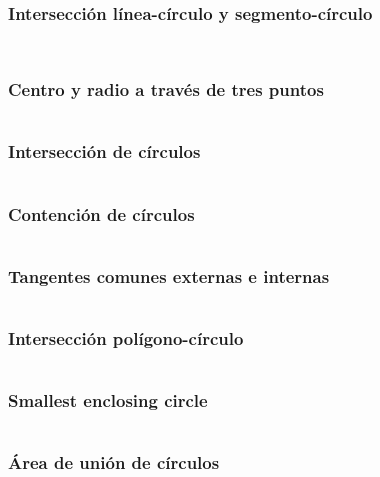 \documentclass[11pt]{article}
\begin{document}
			\subsubsection{Intersección línea-círculo y segmento-círculo}
			\inputminted[tabsize=2,breaklines,firstline=339,lastline=349,fontsize=\small]{c++}{geometry.cpp}
			\inputminted[tabsize=2,breaklines,firstline=351,lastline=358,fontsize=\small]{c++}{geometry.cpp}
			
			\subsubsection{Centro y radio a través de tres puntos}
			\inputminted[tabsize=2,breaklines,firstline=360,lastline=365,fontsize=\small]{c++}{geometry.cpp}
			
			\subsubsection{Intersección de círculos}
			\inputminted[tabsize=2,breaklines,firstline=367,lastline=382,fontsize=\small]{c++}{geometry.cpp}
			
			\subsubsection{Contención de círculos}
			\inputminted[tabsize=2,breaklines,firstline=384,lastline=403,fontsize=\small]{c++}{geometry.cpp}
			
			\subsubsection{Tangentes comunes externas e internas}
			\inputminted[tabsize=2,breaklines,firstline=405,lastline=417,fontsize=\small]{c++}{geometry.cpp}
			
			\subsubsection{Intersección polígono-círculo}
			\inputminted[tabsize=2,breaklines,firstline=419,lastline=454,fontsize=\small]{c++}{geometry.cpp}
			
			\subsubsection{Smallest enclosing circle}
			\inputminted[tabsize=2,breaklines,firstline=456,lastline=487,fontsize=\small]{c++}{geometry.cpp}
			
			\subsubsection{Área de unión de círculos}
			\inputminted[tabsize=2,breaklines,firstline=773,lastline=845,fontsize=\small]{c++}{geometry.cpp}
		
\end{document}
